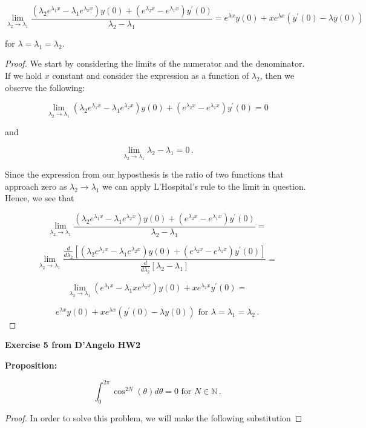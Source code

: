 \documentclass[a4paper]{article}
\numberwithin{equation}{section}
\begin{document}
\begin{description}
$$\lim_{\lambda_2 \rightarrow \lambda_1}\frac{(\lambda_2 e^{\lambda_1 x} - \lambda_1e^{\lambda_2 x})y(0) + (e^{\lambda_2x} - e^{\lambda_1x})y^{\prime}(0)}{\lambda_2 - \lambda_1} = e^{\lambda x}y(0) + xe^{\lambda x}(y^{\prime}(0) - \lambda y(0))$$

for $\lambda = \lambda_1 = \lambda_2$.

\begin{proof} We start by considering the limits of the numerator and the denominator. If we hold $x$ constant and consider the expression as a function of $\lambda_2$, then we observe the following:

$$\lim_{\lambda_2 \rightarrow \lambda_1}(\lambda_2 e^{\lambda_1 x} - \lambda_1e^{\lambda_2 x})y(0) + (e^{\lambda_2x} - e^{\lambda_1x})y^{\prime}(0) = 0$$

and

$$\lim_{\lambda_2 \rightarrow \lambda_1} \lambda_2 - \lambda_1 = 0\,.$$

Since the expression from our hyposthesis is the ratio of two functions that approach zero as $\lambda_2 \rightarrow \lambda_1$ we can apply L'Hospital's rule to the limit in question. Hence, we see that

$$\lim_{\lambda_2 \rightarrow \lambda_1}\frac{(\lambda_2 e^{\lambda_1 x} - \lambda_1e^{\lambda_2 x})y(0) + (e^{\lambda_2x} - e^{\lambda_1x})y^{\prime}(0)}{\lambda_2 - \lambda_1}  =$$

$$ \lim_{\lambda_2 \rightarrow \lambda_1}\frac{\frac{d}{d\lambda_2}[(\lambda_2 e^{\lambda_1 x} - \lambda_1e^{\lambda_2 x})y(0) + (e^{\lambda_2x} - e^{\lambda_1x})y^{\prime}(0)]}{\frac{d}{d\lambda_2}[\lambda_2 - \lambda_1]} = $$

$$\lim_{\lambda_2 \rightarrow \lambda_1} (e^{\lambda_1 x} - \lambda_1 x e^{\lambda_2 x})y(0) + xe^{\lambda_2x}y^{\prime}(0) = $$

$$e^{\lambda x}y(0) + xe^{\lambda x}(y^{\prime}(0) - \lambda y(0)) \text{ for } \lambda = \lambda_1 = \lambda_2\,.$$

\end{proof}

\item \textbf{Exercise 5 from D'Angelo HW2}

\item{\bf{Proposition:}} 

$$\int_0^{2\pi} \cos^{2N}(\theta)d\theta = 0 \text{ for } N \in \mathbb{N}\,.$$

\begin{proof} In order to solve this problem, we will make the following substitution


\end{proof}
\end{description}
\end{document}

